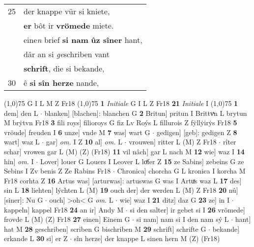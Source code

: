 \documentclass[8pt,a4paper,notitlepage]{article}
\begin{document}
\begin{table}[ht]
\begin{minipage}[t]{0.5\linewidth}
\begin{tabular}{rl}
25 & der knappe vür si kniete,\\ 
 & \textbf{er} bôt ir \textbf{vrömede} miete.\\ 
 & eine\textit{n} brief \textbf{si nam} \textbf{ûz sîner} hant,\\ 
 & dâr an si \textit{ge}schriben vant\\ 
 & \textbf{schrift}, die si bekande,\\ 
30 & ê \textbf{si} \textbf{sîn herze} nande,\\ 
\end{tabular}
\scriptsize
\line(1,0){75} \newline
G I L M Z Fr18 \newline
\line(1,0){75} \newline
\textbf{1} \textit{Initiale} G I L Z Fr18  \textbf{21} \textit{Initiale} I  \newline
\line(1,0){75} \newline
\textbf{1} dem] den L  $\cdot$ blanken] [blachen]: blanchen G \textbf{2} Britun] pritun I Brittvͯn L brytun M brẏtvn Fr18 \textbf{3} fili roys] filioroys G fiz Lv Roýs L fillurois Z fẏllẏirẏs Fr18 \textbf{5} vröude] freuden I \textbf{6} unze] vnde M \textbf{7} was] wart G  $\cdot$ gedigen] [geb]: gedigen Z \textbf{8} wart] waz L  $\cdot$ gar] \textit{om.} I Z \textbf{10} al] \textit{om.} L  $\cdot$ vrouwen] ritter L (M) Z Fr18  $\cdot$ rîter schar] vrowen gar L (M) (Z) (Fr18) \textbf{11} vil nâch] gar L nach M \textbf{12} wie] waz I \textbf{14} hin] \textit{om.} I  $\cdot$ Lover] louer G Louers I Leover L loͤfer Z \textbf{15} ze Sabins] zebeins G ze Sebins I Zv benis Z Ze Rabins Fr18  $\cdot$ Chronica] chorcha G L kronica I korcha M Fr18 corhta Z \textbf{16} Artus was] [arturwas]: artuswas G was I Artuͯs waz L \textbf{17} des] sin L \textbf{18} liehten] lýchten L (M) \textbf{19} ouch der] der werden L (M) Z Fr18 \textbf{20} nû] [siner]: Nu G  $\cdot$ ouch] >oh< G \textit{om.} L  $\cdot$ wie] waz I \textbf{21} ditz] daz G \textbf{23} ze] in I  $\cdot$ kappeln] kappel Fr18 \textbf{24} an ir] Andy M  $\cdot$ si den salter] ir gebet si I \textbf{26} vrömede] frovde L (M) (Z) Fr18 \textbf{27} einen] Einem G  $\cdot$ si nam] nam si I den nam sý L  $\cdot$ hant] hat M \textbf{28} geschriben] scriben G bischriben M \textbf{29} schrift] schrifte G  $\cdot$ bekande] erkande L \textbf{30} si] er Z  $\cdot$ sîn herze] der knappe L sinen hern M (Z) (Fr18) \newline
\end{minipage}
\hspace{0.5cm}
\begin{minipage}[t]{0.5\linewidth}

\end{minipage}
\end{table}
\end{document}
